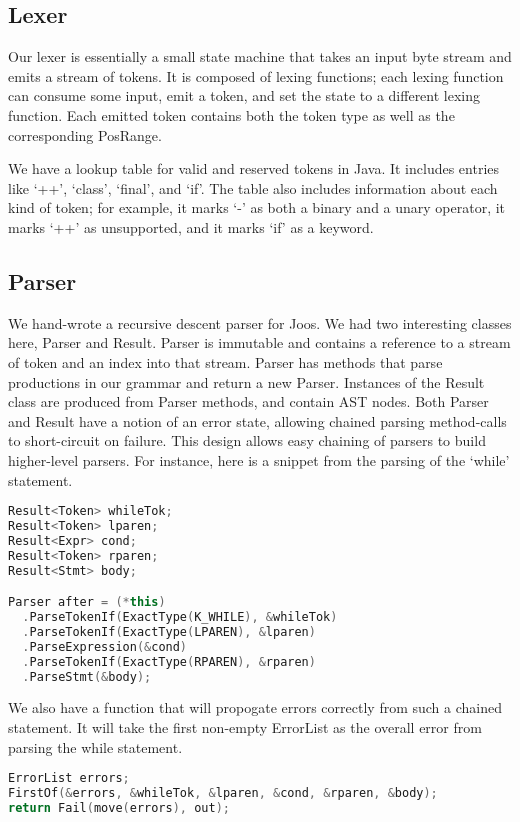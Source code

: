 \documentclass[12pt, titlepage]{article}
\begin{document}
\subsection{Lexer}
Our lexer is essentially a small state machine that takes an input byte stream
and emits a stream of tokens. It is composed of lexing functions; each lexing
function can consume some input, emit a token, and set the state to a different
lexing function. Each emitted token contains both the token type as well as the
corresponding PosRange.

We have a lookup table for valid and reserved tokens in Java. It includes
entries like `++', `class', `final', and `if'. The table also includes
information about each kind of token; for example, it marks `-' as both a
binary and a unary operator, it marks `++' as unsupported, and it marks `if' as
a keyword.


\subsection{Parser}
We hand-wrote a recursive descent parser for Joos. We had two interesting
classes here, Parser and Result. Parser is immutable and contains a reference
to a stream of token and an index into that stream. Parser has methods that
parse productions in our grammar and return a new Parser. Instances of the
Result class are produced from Parser methods, and contain AST nodes. Both
Parser and Result have a notion of an error state, allowing chained parsing
method-calls to short-circuit on failure. This design allows easy chaining of
parsers to build higher-level parsers. For instance, here is a snippet from the
parsing of the `while' statement.
\begin{lstlisting}[language=c++]
Result<Token> whileTok;
Result<Token> lparen;
Result<Expr> cond;
Result<Token> rparen;
Result<Stmt> body;

Parser after = (*this)
  .ParseTokenIf(ExactType(K_WHILE), &whileTok)
  .ParseTokenIf(ExactType(LPAREN), &lparen)
  .ParseExpression(&cond)
  .ParseTokenIf(ExactType(RPAREN), &rparen)
  .ParseStmt(&body);
\end{lstlisting}

We also have a function that will propogate errors correctly from such a
chained statement. It will take the first non-empty ErrorList as the overall
error from parsing the while statement.
\begin{lstlisting}[language=c++]
ErrorList errors;
FirstOf(&errors, &whileTok, &lparen, &cond, &rparen, &body);
return Fail(move(errors), out);
\end{lstlisting}
\end{document}
